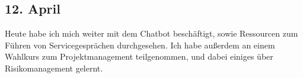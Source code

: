 \subsection{12. April}
Heute habe ich mich weiter mit dem Chatbot beschäftigt, sowie Ressourcen zum Führen von Servicegesprächen durchgesehen. Ich habe außerdem an einem Wahlkurs zum Projektmanagement teilgenommen, und dabei einiges über Risikomanagement gelernt.